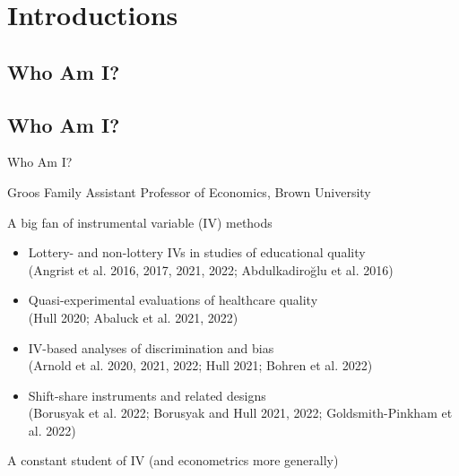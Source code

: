 \documentclass{beamer}
\begin{document}

\section{Introductions}

\subsection{Who Am I?}
\subsection{Who Am I?}
\begin{frame}{Who Am I?}

Groos Family Assistant Professor of Economics, Brown University\pause

A big fan of instrumental variable (IV) methods\pause
\begin{itemize}
  \item Lottery- and non-lottery IVs in studies of educational quality \\ {\scriptsize \textcolor{red!75!green!50!blue!25!gray}{(Angrist et al. 2016, 2017, 2021, 2022; Abdulkadiro\u{g}lu et al. 2016)}}
  \item Quasi-experimental evaluations of healthcare quality \\ {\scriptsize \textcolor{red!75!green!50!blue!25!gray}{(Hull 2020; Abaluck et al. 2021, 2022)}}
  \item IV-based analyses of discrimination and bias \\ {\scriptsize \textcolor{red!75!green!50!blue!25!gray}{(Arnold et al. 2020, 2021, 2022; Hull 2021; Bohren et al. 2022)}}
  \item Shift-share instruments and related designs \\ {\scriptsize \textcolor{red!75!green!50!blue!25!gray}{(Borusyak et al. 2022; Borusyak and Hull 2021, 2022; Goldsmith-Pinkham et al. 2022)}}
\end{itemize}\pause

A constant student of IV (and econometrics more generally)

\end{frame}
\end{document}
